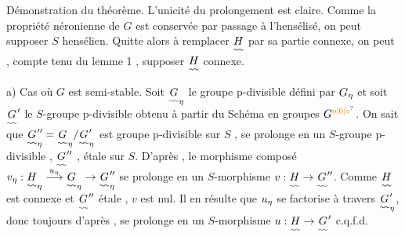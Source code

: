 Démonstration du théorème. L'unicité du prolongement est claire. Comme la
propriété néronienne de $G$ est conservée par passage à l'hensélisé, on peut
supposer $S$ hensélien. Quitte alors à remplacer $\underset{\scriptscriptstyle\sim\!\sim}{H}$ par sa partie connexe, on
peut , compte tenu du lemme 1 , supposer  $\underset{\scriptscriptstyle\sim\!\sim}{H}$ connexe.

a) Cas où $G$ est semi-stable. Soit $\underset{\scriptscriptstyle\sim\!\sim}{G}_{\eta}$ le groupe p-divisible défini par $G_{\eta}$
et soit $\underset{\scriptscriptstyle\sim\!\sim}{G}'$ le $S$-groupe p-divisible obtenu à partir du Schéma en groupes $G^{\unsure{o|0|\circ}}$.
On sait que $\underset{\scriptscriptstyle\sim\!\sim}{G}''_{\eta}=\underset{\scriptscriptstyle\sim\!\sim}{G}_{\eta}/\underset{\scriptscriptstyle\sim\!\sim}{G}'_{\eta}$ est  groupe p-divisible   sur $S$ ,  
se prolonge en un $S$-groupe p-divisible , $\underset{\scriptscriptstyle\sim\!\sim}{G}''$ , étale sur $S$. D'après ,
le morphisme composé $v_{\eta}:\underset{\scriptscriptstyle\sim\!\sim}{H}_{\eta}\overset{u_{\eta}}{\longrightarrow}\underset{\scriptscriptstyle\sim\!\sim}{G}_{\eta}\to\underset{\scriptscriptstyle\sim\!\sim}{G}''_{\eta}$ se prolonge en un $S$-morphisme
$v:\underset{\scriptscriptstyle\sim\!\sim}{H}\to\underset{\scriptscriptstyle\sim\!\sim}{G}''$. Comme $\underset{\scriptscriptstyle\sim\!\sim}{H}$ est connexe et $\underset{\scriptscriptstyle\sim\!\sim}{G}''$ étale , $v$ est nul.  Il en résulte
que $u_{\eta}$ se factorise à travers $\underset{\scriptscriptstyle\sim\!\sim}{G}'_{\eta}$, donc toujours d'après , se prolonge en un $S$-morphisme $u:\underset{\scriptscriptstyle\sim\!\sim}{H}\to\underset{\scriptscriptstyle\sim\!\sim}{G}'$ c.q.f.d.

